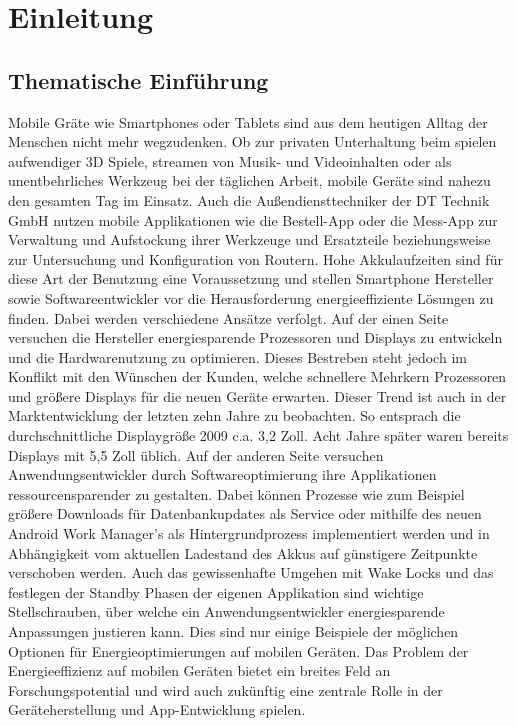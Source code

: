 \chapter{Einleitung}
\section{Thematische Einführung}
Mobile Gräte wie Smartphones oder Tablets sind aus dem heutigen Alltag der Menschen nicht mehr wegzudenken. Ob zur privaten Unterhaltung beim spielen aufwendiger 3D Spiele, streamen von Musik- und Videoinhalten oder als unentbehrliches Werkzeug bei der täglichen Arbeit, mobile Geräte sind nahezu den gesamten Tag im Einsatz. Auch die Außendiensttechniker der DT Technik GmbH nutzen mobile Applikationen wie die Bestell-App oder die Mess-App zur Verwaltung und Aufstockung ihrer Werkzeuge und Ersatzteile beziehungsweise zur Untersuchung und Konfiguration von Routern. Hohe Akkulaufzeiten sind für diese Art der Benutzung eine Voraussetzung und stellen Smartphone Hersteller sowie Softwareentwickler vor die Herausforderung energieeffiziente Lösungen zu finden.
Dabei werden verschiedene Ansätze verfolgt. Auf der einen Seite versuchen die Hersteller energiesparende Prozessoren und Displays zu entwickeln und die Hardwarenutzung zu optimieren. Dieses Bestreben steht jedoch im Konflikt mit den Wünschen der Kunden, welche schnellere Mehrkern Prozessoren und größere Displays für die neuen Geräte erwarten. Dieser Trend ist auch in der Marktentwicklung der letzten zehn Jahre zu beobachten. So entsprach die durchschnittliche Displaygröße 2009 c.a. 3,2 Zoll. Acht Jahre später waren bereits Displays mit 5,5 Zoll üblich. Auf der anderen Seite versuchen Anwendungsentwickler durch Softwareoptimierung ihre Applikationen ressourcensparender zu gestalten. Dabei können Prozesse wie zum Beispiel größere Downloads für Datenbankupdates als Service oder mithilfe des neuen Android Work Manager's als Hintergrundprozess implementiert werden und in Abhängigkeit vom aktuellen Ladestand des Akkus auf günstigere Zeitpunkte verschoben werden. Auch das gewissenhafte Umgehen mit Wake Locks und das festlegen der Standby Phasen der eigenen Applikation sind wichtige Stellschrauben, über welche ein Anwendungsentwickler energiesparende Anpassungen justieren kann. Dies sind nur einige Beispiele  der möglichen Optionen für Energieoptimierungen auf mobilen Geräten. Das Problem der Energieeffizienz auf mobilen Geräten bietet ein breites Feld an Forschungspotential und wird auch zukünftig eine zentrale Rolle in der Geräteherstellung und App-Entwicklung spielen.
